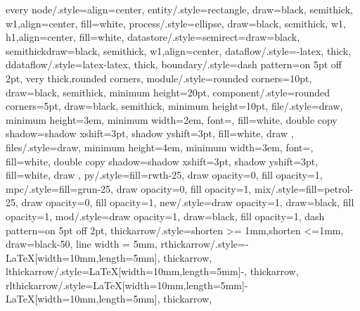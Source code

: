 {	every node/.style={align=center},
	entity/.style={rectangle, draw=black, semithick, w1,align=center, fill=white},
	process/.style={ellipse, draw=black, semithick, w1, h1,align=center, fill=white},
	datastore/.style={semirect={}{draw=black, semithick}{}{draw=black, semithick}, w1,align=center},
	dataflow/.style={-{latex}, thick},
	ddataflow/.style={{latex}-{latex}, thick},
	boundary/.style={dash pattern=on 5pt off 2pt, very thick,rounded corners},
	module/.style={rounded corners=10pt, draw=black, semithick, minimum height=20pt},
	component/.style={rounded corners=5pt, draw=black, semithick, minimum height=10pt},
	file/.style={draw, minimum height=3em, minimum width=2em, font=\ttfamily\scriptsize,
		fill=white, 
		double copy shadow={shadow xshift=3pt, 
			shadow yshift=3pt, fill=white, draw}
	},
	files/.style={draw, minimum height=4em, minimum width=3em, font=\ttfamily\scriptsize,
		fill=white, 
		double copy shadow={shadow xshift=3pt, 
			shadow yshift=3pt, fill=white, draw}
		},
	py/.style={fill=rwth-25, draw opacity=0, fill opacity=1},
	mpc/.style={fill=grun-25, draw opacity=0, fill opacity=1},
	mix/.style={fill=petrol-25, draw opacity=0, fill opacity=1},
	new/.style={draw opacity=1, draw=black, fill opacity=1},
	mod/.style={draw opacity=1, draw=black, fill opacity=1, dash pattern=on 5pt off 2pt},
	thickarrow/.style={shorten >= 1mm,shorten <=1mm, draw=black-50, line width = 5mm},
	rthickarrow/.style={-{LaTeX[width=10mm,length=5mm]}, thickarrow},
	lthickarrow/.style={{LaTeX[width=10mm,length=5mm]}-, thickarrow},
	rlthickarrow/.style={{LaTeX[width=10mm,length=5mm]}-{LaTeX[width=10mm,length=5mm]}, thickarrow},
}




